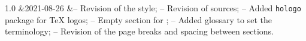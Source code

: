 \begin{longtable}
        1.0
            &2021-08-26
            &-- Revision of the  style;
             \newline -- Revision of \glspl{source};
             \newline -- Added \texttt{hologo} \gls{package} for \TeX{} logos;
             \newline -- Empty section for ;
             \newline -- Added glossary to set the terminology;
             \newline -- Revision of the page breaks and spacing between sections.
        \\\hline
    \end{longtable}
\endgroup